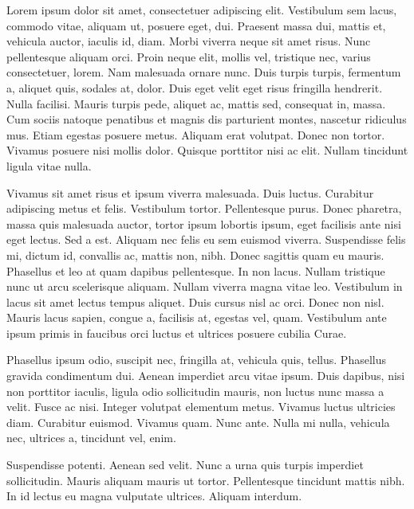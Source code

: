 Lorem ipsum dolor sit amet, consectetuer adipiscing elit. Vestibulum sem lacus,
commodo vitae, aliquam ut, posuere eget, dui. Praesent massa dui, mattis et,
vehicula auctor, iaculis id, diam. Morbi viverra neque sit amet risus. Nunc
pellentesque aliquam orci. Proin neque elit, mollis vel, tristique nec, varius
consectetuer, lorem. Nam malesuada ornare nunc. Duis turpis turpis, fermentum a,
aliquet quis, sodales at, dolor. Duis eget velit eget risus fringilla hendrerit.
Nulla facilisi. Mauris turpis pede, aliquet ac, mattis sed, consequat in, massa.
Cum sociis natoque penatibus et magnis dis parturient montes, nascetur ridiculus
mus. Etiam egestas posuere metus. Aliquam erat volutpat. Donec non tortor.
Vivamus posuere nisi mollis dolor. Quisque porttitor nisi ac elit. Nullam
tincidunt ligula vitae nulla.

Vivamus sit amet risus et ipsum viverra malesuada. Duis luctus. Curabitur
adipiscing metus et felis. Vestibulum tortor. Pellentesque purus. Donec
pharetra, massa quis malesuada auctor, tortor ipsum lobortis ipsum, eget
facilisis ante nisi eget lectus. Sed a est. Aliquam nec felis eu sem euismod
viverra. Suspendisse felis mi, dictum id, convallis ac, mattis non, nibh. Donec
sagittis quam eu mauris. Phasellus et leo at quam dapibus pellentesque. In non
lacus. Nullam tristique nunc ut arcu scelerisque aliquam. Nullam viverra magna
vitae leo. Vestibulum in lacus sit amet lectus tempus aliquet. Duis cursus nisl
ac orci. Donec non nisl. Mauris lacus sapien, congue a, facilisis at, egestas
vel, quam. Vestibulum ante ipsum primis in faucibus orci luctus et ultrices
posuere cubilia Curae.

Phasellus ipsum odio, suscipit nec, fringilla at, vehicula quis, tellus.
Phasellus gravida condimentum dui. Aenean imperdiet arcu vitae ipsum. Duis
dapibus, nisi non porttitor iaculis, ligula odio sollicitudin mauris, non luctus
nunc massa a velit. Fusce ac nisi. Integer volutpat elementum metus. Vivamus
luctus ultricies diam. Curabitur euismod. Vivamus quam. Nunc ante. Nulla mi
nulla, vehicula nec, ultrices a, tincidunt vel, enim.

Suspendisse potenti. Aenean sed velit. Nunc a urna quis turpis imperdiet
sollicitudin. Mauris aliquam mauris ut tortor. Pellentesque tincidunt mattis
nibh. In id lectus eu magna vulputate ultrices. Aliquam interdum.


\outroformatting
